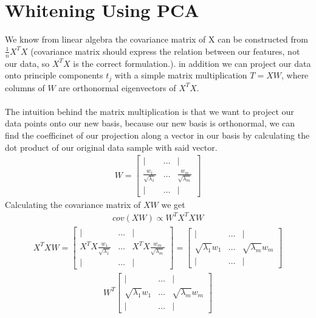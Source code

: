 \documentclass[12pt,onecolumn,a4paper]{article}
\begin{document}
\section{Whitening Using PCA}

We know from linear algebra the covariance matrix of X can be constructed from $\frac{1}{n}X^T X$ (covariance matrix should express the relation between our features, not our data, so $X^T X$ is the correct formulation.). in addition we can project our data onto principle components $t_j$ with a simple matrix multiplication $T = XW$, where columns of $W$ are orthonormal eigenvectors of $X^T X$. 
\\ \\
The intuition behind the matrix multiplication is that we want to project our data points onto our new basis, because our new basis is orthonormal, we can find the coefficinet of our projection along a vector in our basis by calculating the dot product of our original data sample with said vector.
\begin{align*}
	W = \begin{bmatrix}
		\vert & \dots  &\vert \\
		\frac{w_1}{\sqrt{\lambda_1}}   & \dots & \frac{w_m}{\sqrt{\lambda_m}}   \\
		\vert & \dots &\vert
	\end{bmatrix}
\end{align*}
Calculating the covariance matrix of $XW$ we get
\begin{align*}
	cov(XW) \propto W^TX^TXW
\end{align*}
\begin{align*}
	X^TX W = \begin{bmatrix}
		\vert & \dots  &\vert \\
		X^TX\frac{w_1}{\sqrt{\lambda_1}}   & \dots & X^TX\frac{w_m}{\sqrt{\lambda_m}}   \\
		\vert & \dots &\vert
	\end{bmatrix} = \begin{bmatrix}
	\vert & \dots  &\vert \\
	\sqrt{\lambda_1}w_1   & \dots & \sqrt{\lambda_m} w_m   \\
	\vert & \dots &\vert
\end{bmatrix}
\end{align*}
\begin{align*}
	W^T \begin{bmatrix}
		\vert & \dots  &\vert \\
		\sqrt{\lambda_1}w_1   & \dots & \sqrt{\lambda_m} w_m   \\
		\vert & \dots &\vert
	\end{bmatrix} 
\end{align*}
\end{document}
